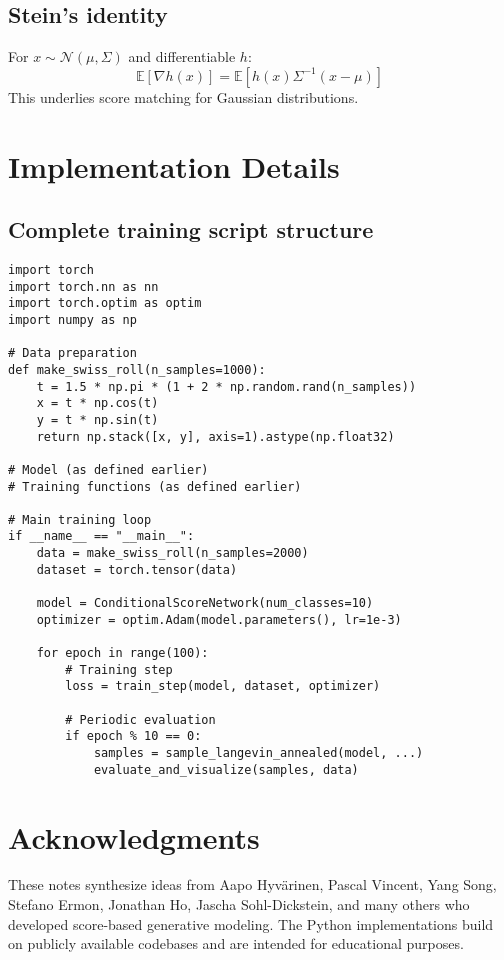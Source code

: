 \documentclass[11pt]{article}
\theoremstyle{definition}
\begin{document}
\subsection{Stein's identity}
For $x \sim \mathcal{N}(\mu, \Sigma)$ and differentiable $h$:
\begin{equation}
\mathbb{E}[\nabla h(x)] = \mathbb{E}[h(x) \Sigma^{-1}(x - \mu)]
\end{equation}
This underlies score matching for Gaussian distributions.

\section{Implementation Details}

\subsection{Complete training script structure}
\begin{lstlisting}[style=py,caption={Recommended project structure}]
import torch
import torch.nn as nn
import torch.optim as optim
import numpy as np

# Data preparation
def make_swiss_roll(n_samples=1000):
    t = 1.5 * np.pi * (1 + 2 * np.random.rand(n_samples))
    x = t * np.cos(t)
    y = t * np.sin(t)
    return np.stack([x, y], axis=1).astype(np.float32)

# Model (as defined earlier)
# Training functions (as defined earlier)

# Main training loop
if __name__ == "__main__":
    data = make_swiss_roll(n_samples=2000)
    dataset = torch.tensor(data)
    
    model = ConditionalScoreNetwork(num_classes=10)
    optimizer = optim.Adam(model.parameters(), lr=1e-3)
    
    for epoch in range(100):
        # Training step
        loss = train_step(model, dataset, optimizer)
        
        # Periodic evaluation
        if epoch % 10 == 0:
            samples = sample_langevin_annealed(model, ...)
            evaluate_and_visualize(samples, data)
\end{lstlisting}

\section*{Acknowledgments}
These notes synthesize ideas from Aapo Hyv\"arinen, Pascal Vincent, Yang Song, Stefano Ermon, 
Jonathan Ho, Jascha Sohl-Dickstein, and many others who developed score-based generative modeling. 
The Python implementations build on publicly available codebases and are intended for educational purposes.
\end{document}
